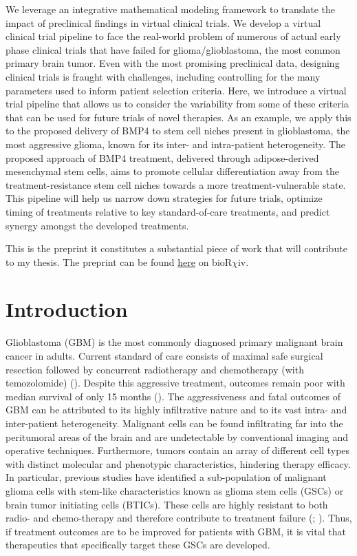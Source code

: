 \documentclass[
  letterpaper,
]{scrreprt}
\theoremstyle{definition}
\theoremstyle{remark}
\begin{document}
We leverage an integrative mathematical modeling framework to translate
the impact of preclinical findings in virtual clinical trials. We
develop a virtual clinical trial pipeline to face the real-world problem
of numerous of actual early phase clinical trials that have failed for
glioma/glioblastoma, the most common primary brain tumor. Even with the
most promising preclinical data, designing clinical trials is fraught
with challenges, including controlling for the many parameters used to
inform patient selection criteria. Here, we introduce a virtual trial
pipeline that allows us to consider the variability from some of these
criteria that can be used for future trials of novel therapies. As an
example, we apply this to the proposed delivery of BMP4 to stem cell
niches present in glioblastoma, the most aggressive glioma, known for
its inter- and intra-patient heterogeneity. The proposed approach of
BMP4 treatment, delivered through adipose-derived mesenchymal stem
cells, aims to promote cellular differentiation away from the
treatment-resistance stem cell niches towards a more
treatment-vulnerable state. This pipeline will help us narrow down
strategies for future trials, optimize timing of treatments relative to
key standard-of-care treatments, and predict synergy amongst the
developed treatments.

\hfill\break

This is the preprint it constitutes a substantial piece of work that
will contribute to my thesis. The preprint can be found
\href{https://www.biorxiv.org/content/10.1101/2024.08.22.609156v1.full}{here}
on bioR\(\chi\)iv.

\section{Introduction}\label{sec-introduction}

Glioblastoma (GBM) is the most commonly diagnosed primary malignant
brain cancer in adults. Current standard of care consists of maximal
safe surgical resection followed by concurrent radiotherapy and
chemotherapy (with temozolomide) (). Despite this aggressive treatment, outcomes remain poor with
median survival of only 15 months (). The aggressiveness and fatal outcomes of GBM can be
attributed to its highly infiltrative nature and to its vast intra- and
inter-patient heterogeneity. Malignant cells can be found infiltrating
far into the peritumoral areas of the brain and are undetectable by
conventional imaging and operative techniques. Furthermore, tumors
contain an array of different cell types with distinct molecular and
phenotypic characteristics, hindering therapy efficacy. In particular,
previous studies have identified a sub-population of malignant glioma
cells with stem-like characteristics known as glioma stem cells (GSCs)
or brain tumor initiating cells (BTICs). These cells are highly
resistant to both radio- and chemo-therapy and therefore contribute to
treatment failure (;
). Thus, if treatment
outcomes are to be improved for patients with GBM, it is vital that
therapeutics that specifically target these GSCs are developed.
\end{document}
